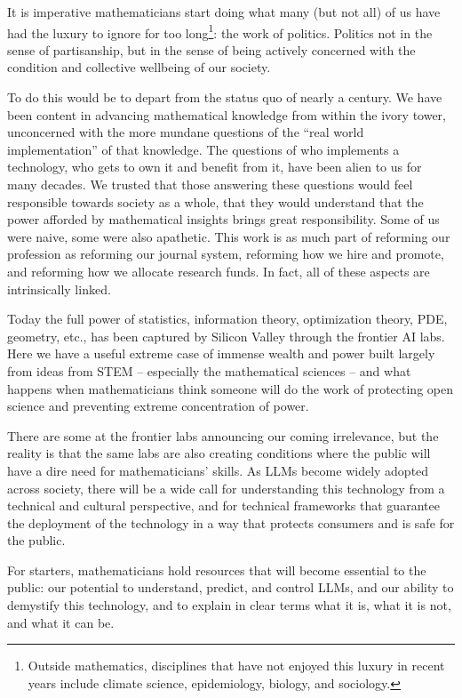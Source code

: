 \documentclass[11pt]{amsart}
\begin{document}
It is imperative mathematicians start doing what many (but not all) of us have had the luxury to ignore for too long\footnote{Outside mathematics, disciplines that have not enjoyed this luxury in recent years include climate science, epidemiology, biology, and sociology.}: the work of politics. Politics not in the sense of partisanship, but in the sense of being actively concerned with the condition and collective wellbeing of our society.

To do this would be to depart from the status quo of nearly a century. We have been content in advancing mathematical knowledge from within the ivory tower, unconcerned with the more mundane questions of the ``real world implementation'' of that knowledge. The questions of who implements a technology, who gets to own it and benefit from it, have been alien to us for many decades. We trusted that those answering these questions would feel responsible towards society as a whole, that they would understand that the power afforded by mathematical insights brings great responsibility. Some of us were naive, some were also apathetic. This work is as much part of reforming our profession as reforming our journal system, reforming how we hire and promote, and reforming how we allocate research funds. In fact, all of these aspects are intrinsically linked.

Today the full power of statistics, information theory, optimization theory, PDE, geometry, etc., has been captured by Silicon Valley through the frontier AI labs. Here we have a useful extreme case of immense wealth and power built largely from ideas from STEM -- especially the mathematical sciences --  and what happens when mathematicians think someone will do the work of protecting open science and preventing extreme concentration of power.

There are some at the frontier labs announcing our coming irrelevance, but the reality is that the same labs are also creating conditions where the public will have a dire need for mathematicians' skills. As LLMs become widely adopted across society, there will be a wide call for understanding this technology from a technical and cultural perspective, and for technical frameworks that guarantee the deployment of the technology in a way that protects consumers and is safe for the public.

For starters, mathematicians hold resources that will become essential to the public: our potential to understand, predict, and control LLMs, and our ability to demystify this technology, and to explain in clear terms what it is, what it is not, and what it can be.
\end{document}
